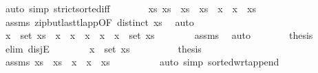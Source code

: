 \begin{isabellebody}
\ {\isacharparenleft}{\kern0pt}auto\ simp{\isacharcolon}{\kern0pt}\ strict{\isacharunderscore}{\kern0pt}sorted{\isacharunderscore}{\kern0pt}iff{\isacharparenright}{\kern0pt}\isanewline
\ \ \ \ \isamarkupfalse%
\ \isamarkupfalse%
\ xs\ xs\ \ {\isachardoublequoteopen}xs\ {\isacharequal}{\kern0pt}\ xs\ {\isacharat}{\kern0pt}\ x\ {\isacharhash}{\kern0pt}\ x\ {\isacharhash}{\kern0pt}\ xs\isanewline
\ \ \ \ \ \ \isamarkupfalse%
\ assms\ zip{\isacharunderscore}{\kern0pt}butlast{\isacharunderscore}{\kern0pt}tl{\isacharunderscore}{\kern0pt}app{\isacharbrackleft}{\kern0pt}OF\ {\isacartoucheopen}distinct\ xs{\isacartoucheclose}{\isacharbrackright}{\kern0pt}\ \isamarkupfalse%
\ auto\isanewline
\ \ \ \ \isamarkupfalse%
\ \isamarkupfalse%
\ {\isachardoublequoteopen}x\ {\isasymin}\ set\ xs\ {\isasymor}\ x\ {\isacharequal}{\kern0pt}\ x\ {\isasymor}\ x\ {\isacharequal}{\kern0pt}\ x\ {\isasymor}\ x\ {\isasymin}\ set\ xs\isanewline
\ \ \ \ \ \ \isamarkupfalse%
\ assms\ \isamarkupfalse%
\ auto\isanewline
\ \ \ \ \isamarkupfalse%
\ \isamarkupfalse%
\ {\isacharquery}{\kern0pt}thesis\isanewline
\ \ \ \ \isamarkupfalse%
\ {\isacharparenleft}{\kern0pt}elim\ disjE{\isacharparenright}{\kern0pt}\isanewline
\ \ \ \ \ \ \isamarkupfalse%
\ {\isachardoublequoteopen}x\ {\isasymin}\ set\ xs\isanewline
\ \ \ \ \ \ \isamarkupfalse%
\ \isamarkupfalse%
\ {\isacharquery}{\kern0pt}thesis\isanewline
\ \ \ \ \ \ \ \ \isamarkupfalse%
\ assms\ {\isacartoucheopen}xs\ {\isacharequal}{\kern0pt}\ xs\ {\isacharat}{\kern0pt}\ x\ {\isacharhash}{\kern0pt}\ x\ {\isacharhash}{\kern0pt}\ xs\isanewline
\ \ \ \ \ \ \ \ \isamarkupfalse%
\ {\isacharparenleft}{\kern0pt}auto\ simp{\isacharcolon}{\kern0pt}\ sorted{\isacharunderscore}{\kern0pt}wrt{\isacharunderscore}{\kern0pt}append{\isacharparenright}{\kern0pt}\isanewline

\end{isabellebody}
